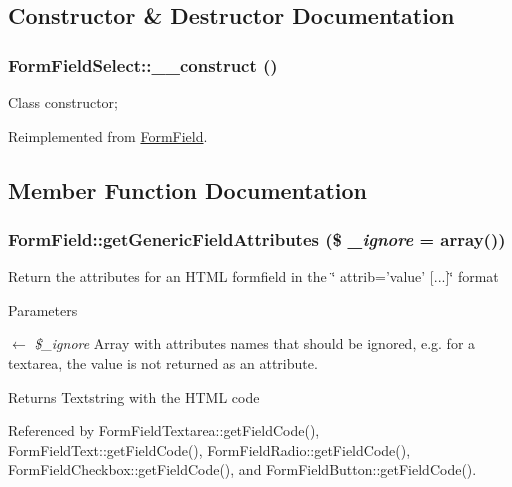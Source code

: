 \subsection{Constructor \& Destructor Documentation}
\subsubsection[{\_\-\_\-construct}]{\setlength{\rightskip}{0pt plus 5cm}FormFieldSelect::\_\-\_\-construct ()}\label{classFormFieldSelect_a32c59192be8c316fb2f7e1edde8f0a98}
Class constructor; 

Reimplemented from \hyperlink{classFormField_a0cfe713ce28a6a0cb53476ed463e1f01}{FormField}.



\subsection{Member Function Documentation}
\subsubsection[{getGenericFieldAttributes}]{\setlength{\rightskip}{0pt plus 5cm}FormField::getGenericFieldAttributes (\$ {\em \_\-ignore} = {\ttfamily array()})}\label{classFormField_a9f9d136ba8b4a793f22370aff43d592d}
Return the attributes for an HTML formfield in the \char`\"{} attrib='value' \mbox{[}...\mbox{]}\char`\"{} format


\begin{DoxyParams}{Parameters}
\item[\mbox{$\leftarrow$} {\em \$\_\-ignore}]Array with attributes names that should be ignored, e.g. for a textarea, the value is not returned as an attribute. \end{DoxyParams}
\begin{DoxyReturn}{Returns}
Textstring with the HTML code 
\end{DoxyReturn}


Referenced by FormFieldTextarea::getFieldCode(), FormFieldText::getFieldCode(), FormFieldRadio::getFieldCode(), FormFieldCheckbox::getFieldCode(), and FormFieldButton::getFieldCode().

